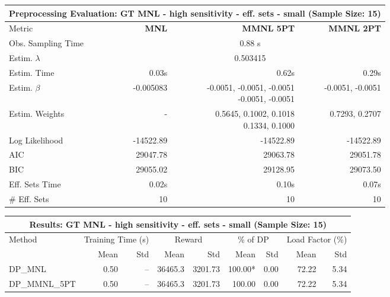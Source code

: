 
\begin{samepage}
\begin{center}
  \small
  \begin{tabular}{l|r|r|r}
    \toprule
    \multicolumn{4}{c}{\textbf{Preprocessing Evaluation: GT MNL - high sensitivity - eff. sets - small (Sample Size: 15)}} \\
    \midrule
    Metric & \textbf{MNL} & \textbf{MMNL 5PT} & \textbf{MMNL 2PT} \\
    \midrule
    Obs. Sampling Time & \multicolumn{3}{c}{0.88 s} \\
    Estim. $\lambda$ & \multicolumn{3}{c}{0.503415} \\
    Estim. Time & 0.03s & 0.62s & 0.29s \\
    Estim. $\beta$ & -0.005083 & \makecell[tr]{-0.0051, -0.0051, -0.0051 \\ -0.0051, -0.0051} & -0.0051, -0.0051 \\
    Estim. Weights & - & \makecell[tr]{0.5645, 0.1002, 0.1018 \\ 0.1334, 0.1000} & 0.7293, 0.2707 \\
    Log Likelihood & -14522.89 & -14522.89 & -14522.89 \\
    AIC & 29047.78 & 29063.78 & 29051.78 \\
    BIC & 29055.02 & 29128.95 & 29073.50 \\
    Eff. Sets Time & 0.02s & 0.10s & 0.07s \\
    \# Eff. Sets & 10 & 10 & 10 \\
    \bottomrule
  \end{tabular}
\end{center}
\begin{center}
  \small
  \begin{tabular}{l|rr|rr|rr|rr}
    \toprule
    \multicolumn{9}{c}{\textbf{Results: GT MNL - high sensitivity - eff. sets - small (Sample Size: 15)}} \\
    \midrule
    Method & \multicolumn{2}{c|}{Training Time (s)} & \multicolumn{2}{c|}{Reward} & \multicolumn{2}{c|}{\% of DP} & \multicolumn{2}{c}{Load Factor (\%)} \\
    & Mean & Std & Mean & Std & Mean & Std & Mean & Std \\
    \midrule
    DP\_MNL      &     0.50 &    -- &    36465.3 &    3201.73 & 100.00* &    0.00 &   72.22 &    5.34 \\
    DP\_MMNL\_5PT &     0.50 &    -- &    36465.3 &    3201.73 &  100.00 &    0.00 &   72.22 &    5.34 \\

\end{tabular}
\end{center}
\end{samepage}
